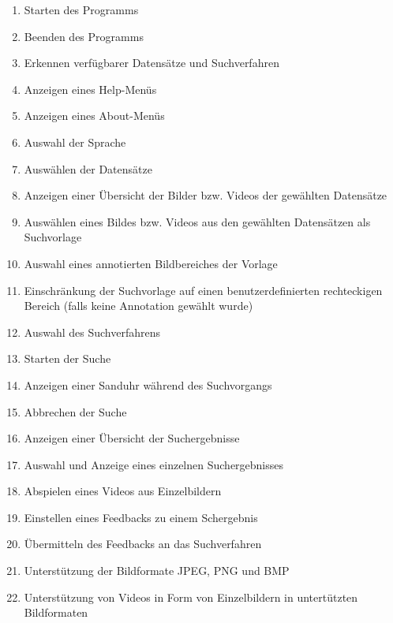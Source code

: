 \begin{enumerate} [label=\bfseries /F \arabic*0/]
	\subsection{Pflicht}
	\item Starten des Programms
	\item Beenden des Programms
	\item Erkennen verfügbarer Datensätze und Suchverfahren
	\item Anzeigen eines Help-Menüs
	\item Anzeigen eines About-Menüs
	\item Auswahl der Sprache
	\newline
	\item Ausw\"ahlen der Datens\"atze
	\item Anzeigen einer Übersicht der Bilder bzw. Videos der gewählten Datensätze
	\item Ausw\"ahlen eines Bildes bzw. Videos aus den gewählten Datensätzen als Suchvorlage
	\item Auswahl eines annotierten Bildbereiches der Vorlage
	\item Einschränkung der Suchvorlage auf einen benutzerdefinierten rechteckigen Bereich (falls keine Annotation gewählt wurde)
	\item Auswahl des Suchverfahrens
	\newline
	\item Starten der Suche
	\item Anzeigen einer Sanduhr während des Suchvorgangs
	\item Abbrechen der Suche
	\newline
	\item Anzeigen einer \"Ubersicht der Suchergebnisse
	\item Auswahl und Anzeige eines einzelnen Suchergebnisses
	\item Abspielen eines Videos aus Einzelbildern
	\item Einstellen eines Feedbacks zu einem Schergebnis
	\item \"Ubermitteln des Feedbacks an das Suchverfahren
	\newline
	\item Unterstützung der Bildformate JPEG, PNG und BMP
	\item Unterstützung von Videos in Form von Einzelbildern in untert\"utzten Bildformaten


\end{enumerate}
